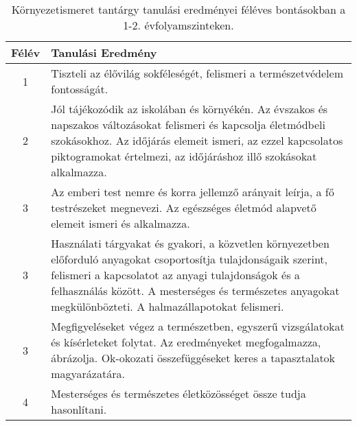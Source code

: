        
           \begin{longtable}{c | p{12cm} }
            \caption[Környezetismeret 1-2.]{Környezetismeret tantárgy tanulási eredményei féléves bontásokban a 1-2. évfolyamszinteken. }  \\

            \textbf{Félév} & \textbf{Tanulási Eredmény} \\
            \hline
            \endhead
                                
                                          1 &  Tiszteli az élővilág sokféleségét, felismeri a természetvédelem fontosságát. \\ \hline
                                      
                                
                                          2 &  Jól tájékozódik az iskolában és környékén. Az évszakos és napszakos változásokat felismeri és kapcsolja életmódbeli szokásokhoz. Az időjárás elemeit ismeri, az ezzel kapcsolatos piktogramokat értelmezi, az időjáráshoz illő szokásokat alkalmazza. \\ \hline
                                      
                                
                                          3 &  Az emberi test nemre és korra jellemző arányait leírja, a fő testrészeket megnevezi. Az egészséges életmód alapvető elemeit ismeri és alkalmazza. \\ \hline
                                          3 &  Használati tárgyakat és gyakori, a közvetlen környezetben előforduló anyagokat csoportosítja tulajdonságaik szerint, felismeri a kapcsolatot az anyagi tulajdonságok és a felhasználás között. A mesterséges és természetes anyagokat megkülönbözteti. A halmazállapotokat felismeri. \\ \hline
                                          3 &  Megfigyeléseket végez a természetben, egyszerű vizsgálatokat és kísérleteket  folytat. Az eredményeket megfogalmazza, ábrázolja. Ok-okozati összefüggéseket keres a tapasztalatok magyarázatára. \\ \hline
                                      
                                
                                          4 &  Mesterséges és természetes életközösséget össze tudja hasonlítani. \\ \hline
                                      
                        \end{longtable}
            \clearpage

